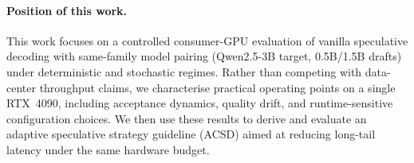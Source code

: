 \paragraph{Position of this work.}
This work focuses on a controlled consumer-GPU evaluation of vanilla
speculative decoding with same-family model pairing (Qwen2.5-3B target,
0.5B/1.5B drafts) under deterministic and stochastic regimes. Rather than
competing with data-center throughput claims, we characterise practical
operating points on a single RTX~4090, including acceptance dynamics,
quality drift, and runtime-sensitive configuration choices. We then use these
results to derive and evaluate an adaptive speculative strategy guideline
(ACSD) aimed at reducing long-tail latency under the same hardware budget.
